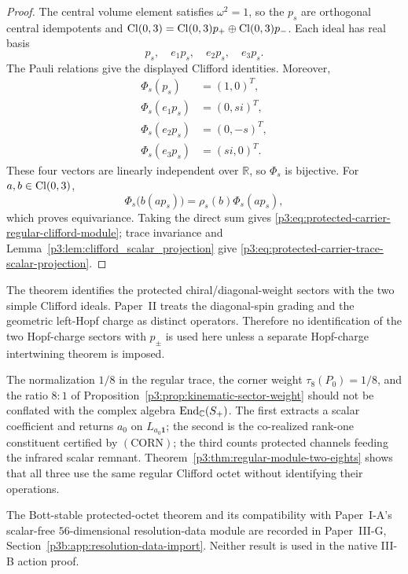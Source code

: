 \documentclass[12pt,a4paper]{article}
\begin{document}
\begin{proof}
The central volume element satisfies \(\omega^2=1\), so the \(p_s\) are
orthogonal central idempotents and
\(\operatorname{Cl}(0,3)=\operatorname{Cl}(0,3)p_+\oplus\operatorname{Cl}(0,3)p_-\).  Each ideal has real basis
\[
 p_s,\quad e_1p_s,\quad e_2p_s,\quad e_3p_s.
\]
The Pauli relations give the displayed Clifford identities.  Moreover,
\[
\begin{aligned}
 \Phi_s(p_s)&=(1,0)^T,\\
 \Phi_s(e_1p_s)&=(0,si)^T,\\
 \Phi_s(e_2p_s)&=(0,-s)^T,\\
 \Phi_s(e_3p_s)&=(si,0)^T.
\end{aligned}
\]
These four vectors are linearly independent over \(\mathbb R\), so \(\Phi_s\)
is bijective.  For \(a,b\in\operatorname{Cl}(0,3)\),
\[
 \Phi_s\bigl(b(ap_s)\bigr)=\rho_s(b)\Phi_s(ap_s),
\]
which proves equivariance.  Taking the direct sum gives
\eqref{p3:eq:protected-carrier-regular-clifford-module}; trace invariance and
Lemma~\ref{p3:lem:clifford_scalar_projection} give
\eqref{p3:eq:protected-carrier-trace-scalar-projection}.
\end{proof}

\begin{remark}
The theorem identifies the protected chiral/diagonal-weight sectors with the two simple Clifford ideals.  Paper~II treats the diagonal-spin grading and the
geometric left-Hopf charge as distinct operators.  Therefore no identification
of the two Hopf-charge sectors with \(p_\pm\) is used here unless a separate
Hopf-charge intertwining theorem is imposed.
\end{remark}

\begin{remark}
\label{p3:rem:two-eights}
The normalization \(1/8\) in the regular trace, the corner weight
\(\tau_8(P_0)=1/8\), and the ratio \(8:1\) of
Proposition~\ref{p3:prop:kinematic-sector-weight} should not be conflated
with the complex algebra \(\operatorname{End}_{\mathbb{C}}(S_+)\).  The first extracts a scalar
coefficient and returns \(a_0\) on \(L_{a_0\mathbf1}\); the second is the
co-realized rank-one constituent certified by \((\mathrm{CORN})\); the third counts protected channels
feeding the infrared scalar remnant.  Theorem~\ref{p3:thm:regular-module-two-eights}
shows that all three use the same regular Clifford octet without identifying
their operations.
\end{remark}


\begin{remark}
The Bott-stable protected-octet theorem and its compatibility with Paper~I-A's
scalar-free \(56\)-dimensional resolution-data module are recorded in
Paper~III-G, Section~\ref{p3b:app:resolution-data-import}.  Neither result is used in the
native III-B action proof.
\end{remark}
\end{document}
